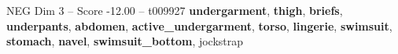 \begin{textsample}{NEG Dim 3 – Score -12.00 – t009927}  \label{ex:f3_neg_027}
\textbf{undergarment}, \textbf{thigh}, \textbf{briefs}, \textbf{underpants}, \textbf{abdomen}, \textbf{active\_undergarment}, \textbf{torso}, \textbf{lingerie}, \textbf{swimsuit}, \textbf{stomach}, \textbf{navel}, \textbf{swimsuit\_bottom}, jockstrap

\end{textsample}
